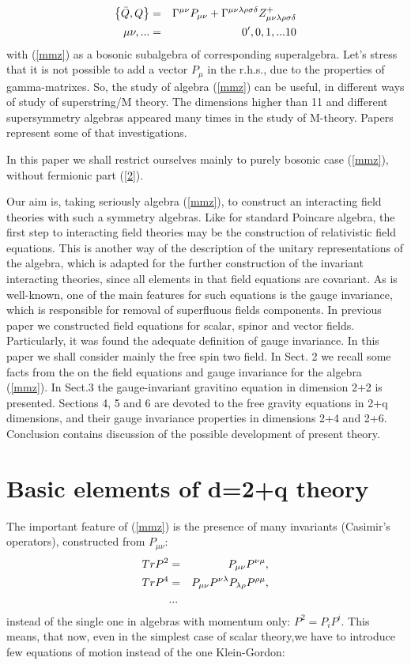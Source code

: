 \documentclass[a4paper,12pt]{article}
\begin{document}
\begin{eqnarray}
\left\{ \bar{Q},Q\right\} &=& \Gamma ^{\mu \nu }P_{\mu \nu
}+\Gamma
 ^{\mu \nu \lambda \rho \sigma \delta }Z_{\mu \nu
\lambda \rho \sigma \delta }^{+}
\label{2} \\
\mu \nu ,... &=&0^{\prime },0,1,...10  \notag
\end{eqnarray}
with (\ref{mmz}) as a bosonic subalgebra of corresponding
superalgebra. Let's stress that it is not possible to add a vector
$P_{\mu}$ in the r.h.s., due to the properties of gamma-matrixes.
So, the study of algebra (\ref{mmz}) can be useful, in different
ways of study of superstring/M theory.
    The dimensions higher than 11 and different
supersymmetry algebras appeared many times in the study of
M-theory. Papers \cite{list} represent some of that
investigations.

In this paper we shall restrict ourselves mainly to purely bosonic
case (\ref{mmz}), without fermionic part (\ref{2}).

Our aim is, taking seriously algebra (\ref{mmz}), to construct an
interacting field theories with such a symmetry algebras. Like for
standard Poincare algebra, the first step to interacting field
theories may be the construction of relativistic field equations.
This is another way of the description of  the unitary
representations of the algebra, which is adapted for the further
construction of the invariant interacting theories, since all
elements in that field equations are covariant. As is well-known,
one of the main features for such equations is the gauge
invariance, which is responsible for removal of superfluous fields
components. In previous paper \cite{Man1} we constructed field
equations for scalar, spinor and vector fields. Particularly, it
was found the adequate definition of gauge invariance. In this
paper we shall consider mainly the free spin two field.
    In Sect. 2 we recall some facts from the \cite{Man1}
   on the
field equations and gauge invariance for the algebra (\ref{mmz}).
In Sect.3 the gauge-invariant gravitino equation in dimension 2+2
is presented. Sections 4, 5  and 6 are devoted to the free gravity
equations in 2+q dimensions, and their gauge invariance properties
in dimensions 2+4 and 2+6. Conclusion contains discussion of the
possible development of present theory.

\section{Basic elements of d=2+q theory}
    The important feature of (\ref{mmz}) is the presence of many
invariants (Casimir's operators), constructed from $P_{\mu\nu}$:
\begin{eqnarray}
TrP^{2} &=&P_{\mu \nu }P^{\nu \mu },  \notag \\
TrP^{4} &=&P_{\mu \nu }P^{\nu \lambda }P_{\lambda \rho }P^{\rho \mu },
\label{3} \\
&...&  \notag
\end{eqnarray}
instead of the single one in algebras with momentum only:
$P^{2}=P_{i}P^{i}$. This means, that now, even in the simplest
case of scalar theory,we have to introduce  few equations of
motion instead of the one Klein-Gordon:
\end{document}
